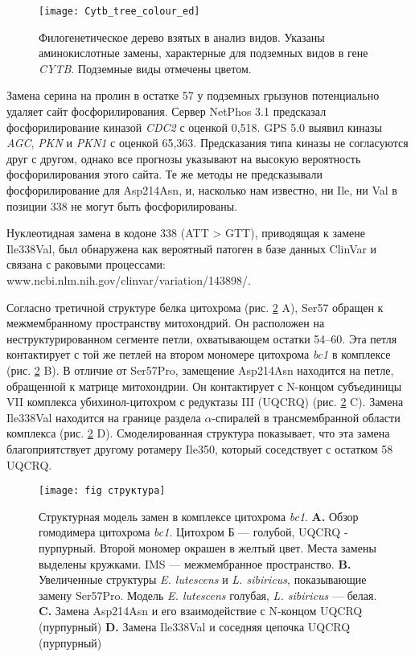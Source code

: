 \begin{figure}[h!]
	\begin{center}
		\texttt{[image: Cytb\_tree\_colour\_ed]}
	\end{center}
	\caption{Филогенетическое дерево взятых в анализ видов. Указаны аминокислотные замены, характерные для подземных видов в гене \textit{CYTB}. Подземные виды отмечены цветом.}
	\label{PhyloTree}
\end{figure}

Замена серина на пролин в остатке 57 у подземных грызунов потенциально удаляет сайт фосфорилирования. Сервер NetPhos 3.1 предсказал фосфорилирование киназой \textit{CDC2} с оценкой 0,518. GPS 5.0 выявил киназы \textit{AGC}, \textit{PKN} и \textit{PKN1} с оценкой 65,363. Предсказания типа киназы не согласуются друг с другом, однако все прогнозы указывают на высокую вероятность фосфорилирования этого сайта. Те же методы не предсказывали фосфорилирование для Asp214Asn, и, насколько нам известно, ни Ile, ни Val в позиции 338 не могут быть фосфорилированы.

Нуклеотидная замена в кодоне 338 (ATT > GTT), приводящая к замене Ile338Val, был обнаружена как вероятный патоген в базе данных ClinVar и связана с раковыми процессами: www.ncbi.nlm.nih.gov/clinvar/variation/143898/.

Согласно третичной структуре белка цитохрома (рис. \ref{CytStructure} A), Ser57 обращен к межмембранному пространству митохондрий. Он расположен на неструктурированном сегменте петли, охватывающем остатки 54–60. Эта петля контактирует с той же петлей на втором мономере цитохрома \textit{bc1} в комплексе (рис. \ref{CytStructure} B). В отличие от Ser57Pro, замещение Asp214Asn находится на петле, обращенной к матрице митохондрии. Он контактирует с N-концом субъединицы VII комплекса убихинол-цитохром с редуктазы III (UQCRQ) (рис. \ref{CytStructure} C). Замена Ile338Val находится на границе раздела $\alpha$-спиралей в трансмембранной области комплекса (рис. \ref{CytStructure} D). Смоделированная структура показывает, что эта замена благоприятствует другому ротамеру Ile350, который соседствует с остатком 58 UQCRQ.

\begin{figure}[h!]
	\begin{center}
		\texttt{[image: fig структура]}
	\end{center}
	\caption{Структурная модель замен в комплексе цитохрома \textit{bc1}. \textbf{A.} Обзор гомодимера цитохрома \textit{bc1}. Цитохром Б --- голубой, UQCRQ - пурпурный. Второй мономер окрашен в желтый цвет. Места замены выделены кружками. IMS --- межмембранное пространство. \textbf{B.} Увеличенные структуры \textit{E. lutescens} и \textit{L. sibiricus}, показывающие замену Ser57Pro. Модель \textit{E. lutescens} голубая, \textit{L. sibiricus} --- белая. \textbf{C.} Замена Asp214Asn и его взаимодействие с N-концом UQCRQ (пурпурный) \textbf{D.} Замена Ile338Val и соседняя цепочка UQCRQ (пурпурный)}
	\label{CytStructure}
\end{figure}

